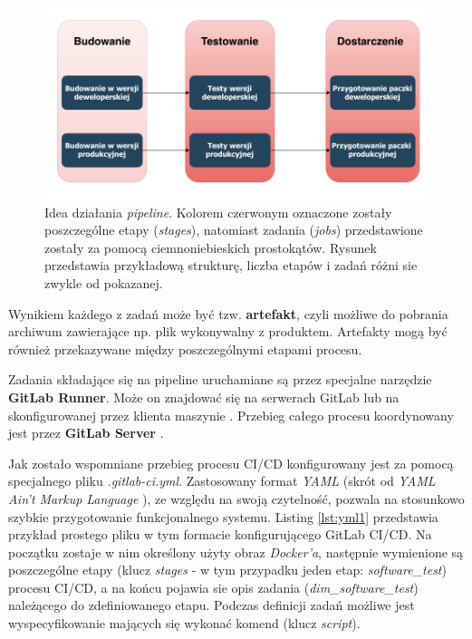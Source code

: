 \begin{figure}
\centering
\caption{Idea działania \textit{pipeline}. Kolorem czerwonym oznaczone zostały poszczególne etapy (\textit{stages}), natomiast zadania (\textit{jobs}) przedstawione zostały za pomocą ciemnoniebieskich prostokątów. Rysunek przedstawia przykładową strukturę, liczba etapów i zadań różni sie zwykle od pokazanej.}
\label{fig:pipeline}
\includegraphics[width=\textwidth]{res/Pipeline.pdf}
\end{figure}

Wynikiem każdego z zadań może być tzw. \textbf{artefakt}, czyli możliwe do pobrania archiwum zawierające np. plik wykonywalny z produktem. Artefakty mogą być również przekazywane między poszczególnymi etapami procesu. 

Zadania składające się na pipeline uruchamiane są przez specjalne narzędzie \textbf{GitLab Runner}. Może on znajdować się na serwerach GitLab lub na skonfigurowanej przez klienta maszynie \cite{CIzGitLab}. Przebieg całego procesu koordynowany jest przez \textbf{GitLab Server} \cite{GitLabPage}.

Jak zostało wspomniane przebieg procesu CI/CD konfigurowany jest za pomocą specjalnego pliku \textit{.gitlab-ci.yml}. Zastosowany format \textit{YAML} (skrót od \textit{YAML Ain't Markup Language} \cite{YAMLWiki}), ze względu na swoją czytelność, pozwala na stosunkowo szybkie przygotowanie funkcjonalnego systemu. Listing \ref{lst:yml1} przedstawia przykład prostego pliku w tym formacie konfigurującego GitLab CI/CD. Na początku zostaje w nim określony użyty obraz \textit{Docker'a}, następnie wymienione są poszczególne etapy (klucz \textit{stages} - w tym przypadku jeden etap: \textit{software\_test}) procesu CI/CD, a na końcu pojawia sie opis zadania (\textit{dim\_software\_test}) należącego do zdefiniowanego etapu. Podczas definicji zadań możliwe jest wyspecyfikowanie mających się wykonać komend (klucz \textit{script}).

